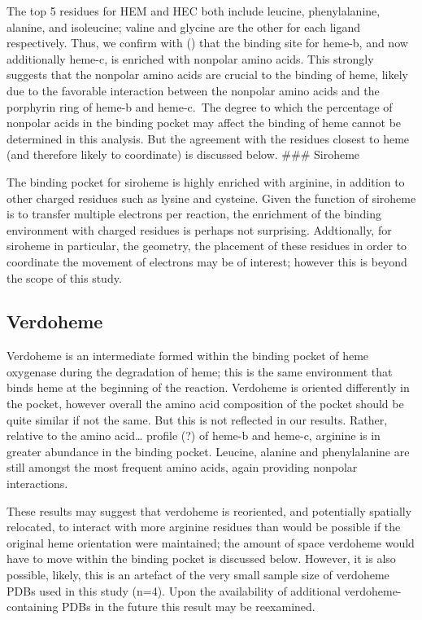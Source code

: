 \documentclass[a4paper, nobind]{templates/ociamthesis}
\begin{document}
The top 5 residues for HEM and HEC both include leucine, phenylalanine, alanine, and isoleucine; valine and glycine are the other for each ligand respectively. Thus, we confirm with (\textcite{Li2011}) that the binding site for heme-b, and now additionally heme-c, is enriched with nonpolar amino acids. This strongly suggests that the nonpolar amino acids are crucial to the binding of heme, likely due to the favorable interaction between the nonpolar amino acids and the porphyrin ring of heme-b and heme-c.~The degree to which the percentage of nonpolar acids in the binding pocket may affect the binding of heme cannot be determined in this analysis. But the agreement with the residues closest to heme (and therefore likely to coordinate) is discussed below.
\#\#\# Siroheme

The binding pocket for siroheme is highly enriched with arginine, in addition to other charged residues such as lysine and cysteine. Given the function of siroheme is to transfer multiple electrons per reaction, the enrichment of the binding environment with charged residues is perhaps not surprising. Addtionally, for siroheme in particular, the geometry, the placement of these residues in order to coordinate the movement of electrons may be of interest; however this is beyond the scope of this study.

\hypertarget{verdoheme}{%
\subsection{Verdoheme}\label{verdoheme}}

Verdoheme is an intermediate formed within the binding pocket of heme oxygenase during the degradation of heme; this is the same environment that binds heme at the beginning of the reaction. Verdoheme is oriented differently in the pocket, however overall the amino acid composition of the pocket should be quite similar if not the same. But this is not reflected in our results. Rather, relative to the amino acid\ldots{} profile (?) of heme-b and heme-c, arginine is in greater abundance in the binding pocket. Leucine, alanine and phenylalanine are still amongst the most frequent amino acids, again providing nonpolar interactions.

These results may suggest that verdoheme is reoriented, and potentially spatially relocated, to interact with more arginine residues than would be possible if the original heme orientation were maintained; the amount of space verdoheme would have to move within the binding pocket is discussed below. However, it is also possible, likely, this is an artefact of the very small sample size of verdoheme PDBs used in this study (n=4). Upon the availability of additional verdoheme-containing PDBs in the future this result may be reexamined.
\end{document}
